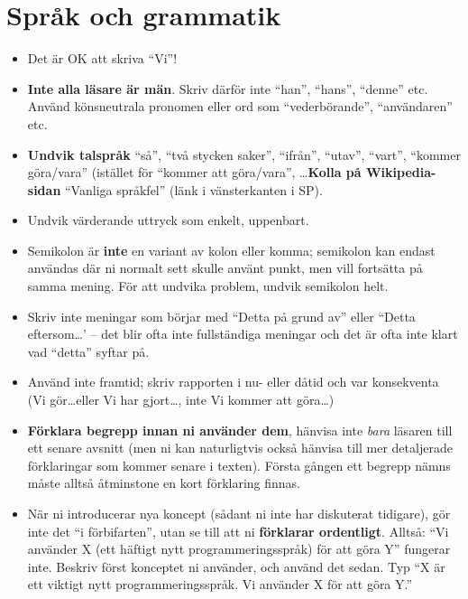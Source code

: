\documentclass[swedish, a4paper,12pt]{article}
\begin{document}
\section{Språk och grammatik}
\label{sec:sprak-och-grammatik}

\begin{itemize}
\item    Det är OK att skriva ``Vi''!

\item    \textbf{Inte alla läsare är män}.  Skriv därför inte ``han'', ``hans'', ``denne'' etc.  Använd könsneutrala pronomen eller ord som ``vederbörande'', ``användaren'' etc.

\item    \textbf{Undvik talspråk} ``så'', ``två stycken saker'', ``ifrån'', ``utav'', ``vart'', ``kommer göra/vara'' (istället för ``kommer att göra/vara'', \ldots \textbf{Kolla på Wikipedia-sidan} ``Vanliga språkfel'' (länk i vänsterkanten i SP).

\item    Undvik värderande uttryck som enkelt, uppenbart.

\item    Semikolon är \textbf{inte} en variant av kolon eller komma; semikolon kan endast användas där ni normalt sett skulle använt punkt, men vill fortsätta på samma mening. För att undvika problem, undvik semikolon helt.

\item    Skriv inte meningar som börjar med ``Detta på grund av'' eller ``Detta eftersom\ldots' -- det blir ofta inte fullständiga meningar och det är ofta inte klart vad ``detta'' syftar på.

\item    Använd inte framtid; skriv rapporten i nu- eller dåtid och var konsekventa (Vi gör\ldots eller Vi har gjort\ldots, inte Vi kommer att göra\ldots)

\item    \textbf{Förklara begrepp innan ni använder dem}, hänvisa inte \emph{bara} läsaren till ett senare avsnitt (men ni kan naturligtvis också hänvisa till mer detaljerade förklaringar som kommer senare i texten).  Första gången ett begrepp nämns måste alltså åtminstone en kort förklaring finnas.

\item    När ni introducerar nya koncept (sådant ni inte har diskuterat tidigare), gör inte det ``i förbifarten'', utan se till att ni \textbf{förklarar ordentligt}.  Alltså: ``Vi använder X (ett häftigt nytt programmeringsspråk) för att göra Y'' fungerar inte.  Beskriv först konceptet ni använder, och använd det sedan.  Typ ``X är ett viktigt nytt programmeringsspråk.  Vi använder X för att göra Y.''


\end{itemize}
\end{document}

